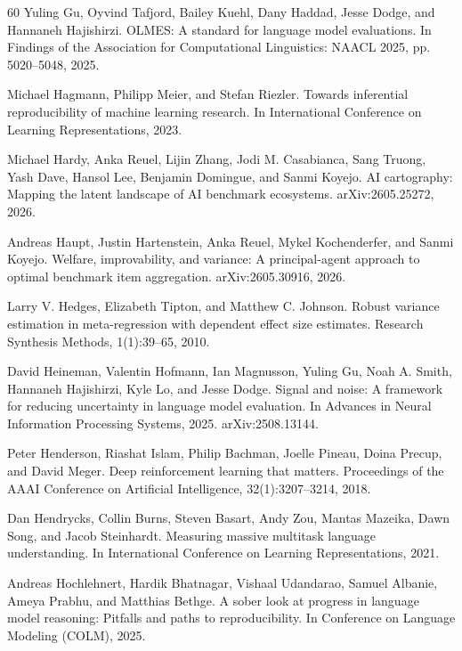 \begin{thebibliography}{60}
Yuling Gu, Oyvind Tafjord, Bailey Kuehl, Dany Haddad, Jesse Dodge, and Hannaneh Hajishirzi. OLMES: A standard for language model evaluations. In Findings of the Association for Computational Linguistics: NAACL 2025, pp. 5020--5048, 2025.

Michael Hagmann, Philipp Meier, and Stefan Riezler. Towards inferential reproducibility of machine learning research. In International Conference on Learning Representations, 2023.

Michael Hardy, Anka Reuel, Lijin Zhang, Jodi M. Casabianca, Sang Truong, Yash Dave, Hansol Lee, Benjamin Domingue, and Sanmi Koyejo. AI cartography: Mapping the latent landscape of AI benchmark ecosystems. arXiv:2605.25272, 2026.

Andreas Haupt, Justin Hartenstein, Anka Reuel, Mykel Kochenderfer, and Sanmi Koyejo. Welfare, improvability, and variance: A principal-agent approach to optimal benchmark item aggregation. arXiv:2605.30916, 2026.

Larry V. Hedges, Elizabeth Tipton, and Matthew C. Johnson. Robust variance estimation in meta-regression with dependent effect size estimates. Research Synthesis Methods, 1(1):39--65, 2010.

David Heineman, Valentin Hofmann, Ian Magnusson, Yuling Gu, Noah A. Smith, Hannaneh Hajishirzi, Kyle Lo, and Jesse Dodge. Signal and noise: A framework for reducing uncertainty in language model evaluation. In Advances in Neural Information Processing Systems, 2025. arXiv:2508.13144.

Peter Henderson, Riashat Islam, Philip Bachman, Joelle Pineau, Doina Precup, and David Meger. Deep reinforcement learning that matters. Proceedings of the AAAI Conference on Artificial Intelligence, 32(1):3207--3214, 2018.

Dan Hendrycks, Collin Burns, Steven Basart, Andy Zou, Mantas Mazeika, Dawn Song, and Jacob Steinhardt. Measuring massive multitask language understanding. In International Conference on Learning Representations, 2021.

Andreas Hochlehnert, Hardik Bhatnagar, Vishaal Udandarao, Samuel Albanie, Ameya Prabhu, and Matthias Bethge. A sober look at progress in language model reasoning: Pitfalls and paths to reproducibility. In Conference on Language Modeling (COLM), 2025.


\end{thebibliography}
